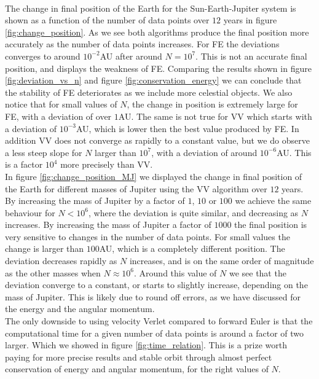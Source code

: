 \documentclass[%
 reprint,
nofootinbib,
aps,
]{revtex4-1}
\begin{document}
\\
The change in final position of the Earth for the Sun-Earth-Jupiter system is shown as a function of the number of data points over $12$ years in figure \vref{fig:change_position}. As we see both algorithms produce the final position more accurately as the number of data points increases. For FE the deviations converges to around $10^{-2}$AU after around $N=10^{7}$. This is not an accurate final position, and displays the weakness of FE.
Comparing the results shown in figure \vref{fig:deviation_vs_n} and figure \vref{fig:conservation_energy} we can conclude that the stability of FE deteriorates as we include more celestial objects.
We also notice that for small values of $N$, the change in position is extremely large for FE, with a deviation of over $1$AU. The same is not true for VV which starts with a deviation of $10^{-3}$AU, which is lower then the best value produced by FE. In addition VV does not converge as rapidly to a constant value, but we do observe a less steep slope for $N$ larger than $10^{7}$, with a deviation of around $10^{-6}$AU. This is a factor $10^{4}$ more precisely than VV.\\
In figure \vref{fig:change_position_MJ} we displayed the change in final position of the Earth for different masses of Jupiter using the VV algorithm over $12$ years. By increasing the mass of Jupiter by a factor of $1$, $10$ or $100$ we achieve the same behaviour for $N<10^{6}$, where the deviation is quite similar, and decreasing as $N$ increases. By increasing the mass of Jupiter a factor of $1000$ the final position is very sensitive to changes in the number of data points. For small values the change is larger than $100$AU, which is a completely different position. The deviation decreases rapidly as $N$ increases, and is on the same order of magnitude as the other masses when $N\approx 10^{6}$. Around this value of $N$ we see that the deviation converge to a constant, or starts to slightly increase, depending on the mass of Jupiter. This is likely due to round off errors, as we have discussed for the energy and the angular momentum.\\
The only downside to using velocity Verlet compared to forward Euler is that the computational time for a given number of data points is around a factor of two larger. Which we showed in figure \vref{fig:time_relation}. This is a prize worth paying for more precise results and stable orbit through almost perfect conservation of energy and angular momentum, for the right values of $N$.
\end{document}
